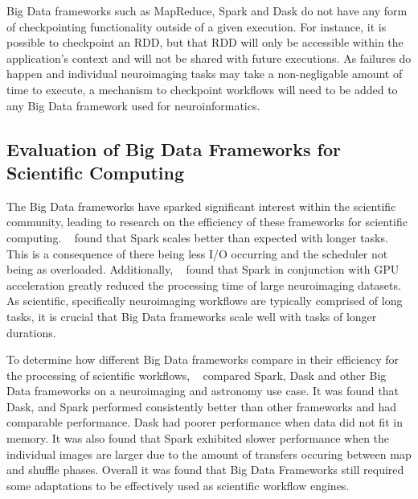             Big Data frameworks such as MapReduce, Spark and Dask do not have   
            any form of checkpointing functionality outside of a given          
            execution. For instance, it is possible to checkpoint an RDD, but   
            that RDD will only be accessible within the application's context   
            and will not be shared with future executions. As failures do       
            happen and individual neuroimaging tasks may take a non-negligable  
            amount of time to execute, a mechanism to checkpoint workflows      
            will need to be added to any Big Data framework used for
            neuroinformatics.                                                   

                                                                                
        \subsection{Evaluation of Big Data Frameworks for Scientific
        Computing}\label{eval}     
            The Big Data frameworks have sparked significant interest within the
            scientific community, leading to research on the efficiency of      
            these frameworks for scientific computing. ~\cite{souza2017spark}
            found  
            that Spark scales better than expected with longer tasks. This is   
            a consequence of there being less I/O occurring and the scheduler
            not being as overloaded. Additionally, ~\cite{boubela2016big} found
            that Spark in conjunction with  
            GPU acceleration greatly reduced the processing time of large       
            neuroimaging datasets.                                              
            As scientific, specifically neuroimaging workflows are typically    
            comprised of long tasks, it                                         
            is crucial that Big Data frameworks scale well with tasks of longer
            durations.
    
            To determine how different Big Data frameworks compare in their
            efficiency for the processing of scientific workflows,
            ~\cite{mehta2017comparative} compared Spark, Dask and other Big Data
            frameworks on a neuroimaging and astronomy use case. It was found
            that Dask, and Spark performed consistently better than other
            frameworks and had comparable performance. Dask had poorer
            performance when data did not fit in memory. It was also found that
            Spark exhibited slower performance when the individual images are
            larger due to the amount of transfers occuring between map and
            shuffle phases. Overall it was found that Big Data Frameworks still
            required some adaptations to be effectively used as scientific
            workflow engines.            
            
